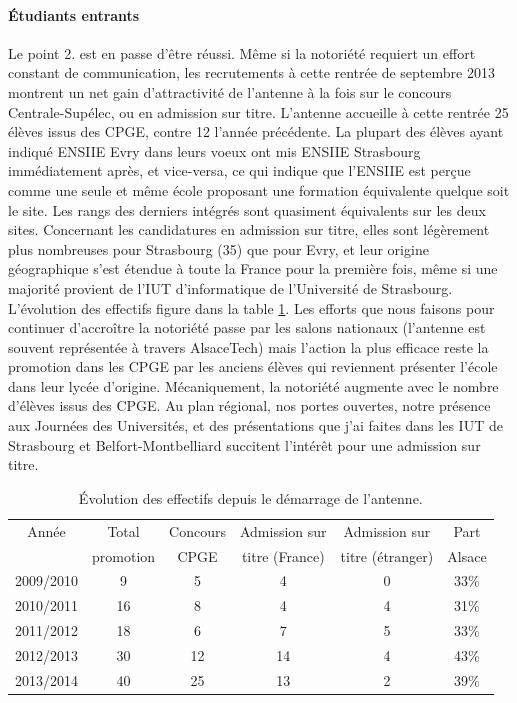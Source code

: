 \documentclass[11pt]{article}
\begin{document}
\paragraph{Étudiants entrants} 
Le point 2. est en passe d'être  réussi. Même si la notoriété requiert un effort
constant de  communication, les recrutements  à cette rentrée de  septembre 2013
montrent  un net  gain d'attractivité  de l'antenne  à la  fois sur  le concours
Centrale-Supélec,  ou  en admission  sur  titre.   L'antenne accueille  à  cette
rentrée 25 élèves issus des CPGE,  contre 12 l'année précédente.  La plupart des
élèves ayant  indiqué ENSIIE  Evry dans  leurs voeux  ont mis  ENSIIE Strasbourg
immédiatement après, et vice-versa, ce qui indique que l'ENSIIE est perçue comme
une seule  et même  école proposant  une formation  équivalente quelque  soit le
site. Les  rangs des derniers intégrés  sont quasiment équivalents sur  les deux
sites.   Concernant  les  candidatures  en   admission  sur  titre,  elles  sont
légèrement plus nombreuses  pour Strasbourg (35) que pour Evry,  et leur origine
géographique s'est étendue à toute la France  pour la première fois, même si une
majorité    provient    de    l'IUT   d'informatique    de    l'Université    de
Strasbourg. L'évolution des effectifs  figure dans la table \ref{tab:effectifs}.
Les efforts que  nous faisons pour continuer d'accroître la  notoriété passe par
les salons  nationaux (l'antenne est  souvent représentée à  travers AlsaceTech)
mais l'action la plus efficace reste la  promotion dans les CPGE par les anciens
élèves   qui   reviennent  présenter   l'école   dans   leur  lycée   d'origine.
Mécaniquement, la notoriété augmente avec le  nombre d'élèves issus des CPGE. Au
plan régional, nos portes ouvertes, notre présence aux Journées des Universités,
et  des   présentations  que  j'ai  faites   dans  les  IUT  de   Strasbourg  et
Belfort-Montbelliard succitent l'intérêt pour une admission sur titre.

\begin{centering}
\begin{table}[hbt]
\begin{center}
\begin{tabular}{|c|c|c|c|c|c|}
\hline
Année &	Total &  Concours & Admission sur  &	Admission sur  & 	Part  \\
      & promotion &  CPGE & titre (France) &     titre (étranger)&     Alsace \\
\hline
2009/2010	& 9	& 5	& 4	& 0	    & 33\% \\
2010/2011	& 16	& 8	& 4	& 4	    & 31\% \\
2011/2012	& 18	& 6	& 7	& 5	    & 33\% \\
2012/2013	& 30	& 12	& 14	& 4	    & 43\% \\ 
2013/2014	& 40	& 25    & 13	& 2	    & 39\% \\
\hline
\hline
\end{tabular}
\end{center}
\caption{Évolution des effectifs depuis le démarrage de l'antenne.}
\label{tab:effectifs}
\end{table}
\end{centering}
\end{document}

